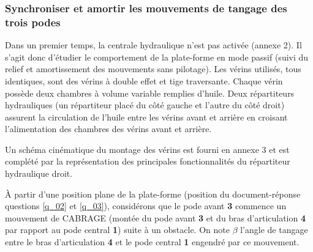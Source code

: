 \subsubsection{Synchroniser et amortir les mouvements de tangage des trois podes}
\ifprof
\else

Dans un premier temps, la centrale hydraulique n’est pas activée (annexe 2). Il s’agit donc d’étudier le comportement
de la plate-forme en mode passif (suivi du relief et amortissement des mouvements sans pilotage).
Les vérins utilisés, tous identiques, sont des vérins à double effet et tige traversante. Chaque vérin possède deux
chambres à volume variable remplies d’huile. Deux répartiteurs hydrauliques (un répartiteur placé du côté gauche et
l’autre du côté droit) assurent la circulation de l’huile entre les vérins avant et arrière en croisant l’alimentation des
chambres des vérins avant et arrière.

Un schéma cinématique du montage des vérins est fourni en annexe 3 et est complété par la représentation des
principales fonctionnalités du répartiteur hydraulique droit.
\fi


\ifprof
\begin{corrige}
\end{corrige}
\else
\fi

\ifprof
\else

À partir d’une position plane de la plate-forme (position du document-réponse questions \ref{q_02} et \ref{q_03}), considérons que le pode avant \textbf{3} commence un mouvement de CABRAGE (montée du pode avant \textbf{3} et du bras d’articulation \textbf{4} par rapport au pode central \textbf{1}) suite à un obstacle. On note $\beta$ l’angle de tangage entre le bras d’articulation \textbf{4} et le pode central \textbf{1} engendré par ce mouvement.
\fi

\ifprof
\begin{corrige}
\end{corrige}
\else
\fi


